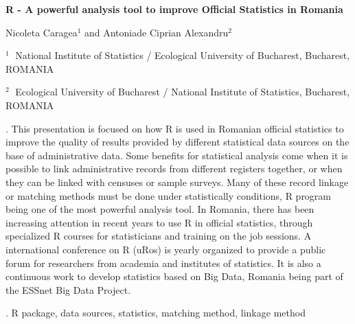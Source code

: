 \documentclass[12pt]{article}
\begin{document}
\begin{flushleft}


{\LARGE\bf R - A powerful analysis tool to improve Official Statistics in Romania}


\vspace{1.0cm}

Nicoleta Caragea$^1$ and Antoniade Ciprian Alexandru$^2$

\begin{description}

\item $^1 \;$ National Institute of Statistics / Ecological University of Bucharest, Bucharest, ROMANIA

\item $^2 \;$ Ecological University of Bucharest / National Institute of Statistics, Bucharest, ROMANIA

\end{description}

\end{flushleft}


\vspace{0.75cm}

. This presentation is focused on how R is used in Romanian official statistics to improve the quality of results provided by different statistical data sources on the base of administrative data.  Some benefits for statistical analysis come when it is possible to link administrative records from different registers together, or when they can be linked with censuses or sample surveys. Many of these record linkage or matching methods must be done under statistically conditions, R program being one of the most powerful analysis tool.
In Romania, there has been increasing attention in recent years to use R in official statistics, through specialized R courses for statisticians and training on the job sessions. A international conference on R (uRos) is yearly organized to provide a public forum for researchers from academia and institutes of statistics. It is also a continuous work to develop statistics based on Big Data, Romania being part of the ESSnet Big Data Project.

\vskip 2mm

.
R package, data sources, statistics, matching method, linkage method
\end{document}
